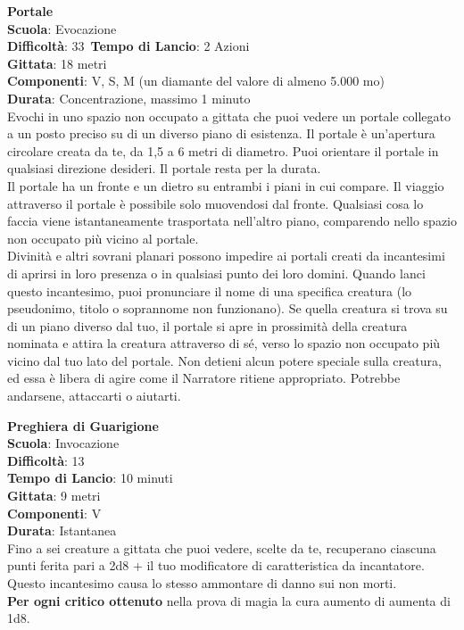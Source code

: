 \begin{multicols}{2}
\medskip\textbf{Portale}\\
\textbf{Scuola}: Evocazione\\
\textbf{Difficoltà}: 33\
\textbf{Tempo di Lancio}: 2 Azioni\\
\textbf{Gittata}: 18 metri\\
\textbf{Componenti}: V, S, M (un diamante del valore di almeno 5.000 mo)\\
\textbf{Durata}: Concentrazione, massimo 1 minuto\\
Evochi in uno spazio non occupato a gittata che puoi vedere un portale collegato a un posto preciso su di un diverso piano di esistenza. Il portale è un'apertura circolare creata da te, da 1,5 a 6 metri di diametro. Puoi orientare il portale in qualsiasi direzione desideri. Il portale resta per la durata.\\
Il portale ha un fronte e un dietro su entrambi i piani in cui compare. Il viaggio attraverso il portale è possibile solo muovendosi dal fronte. Qualsiasi cosa lo faccia viene istantaneamente trasportata nell'altro piano, comparendo nello spazio non occupato più vicino al portale.\\
Divinità e altri sovrani planari possono impedire ai portali creati da incantesimi di aprirsi in loro presenza o in qualsiasi punto dei loro domini. Quando lanci questo incantesimo, puoi pronunciare il nome di una specifica creatura (lo pseudonimo, titolo o soprannome non funzionano). Se quella creatura si trova su di un piano diverso dal tuo, il portale si apre in prossimità della creatura nominata e attira la creatura attraverso di sé, verso lo spazio non occupato più vicino dal tuo lato del portale. Non detieni alcun potere speciale sulla creatura, ed essa è libera di agire come il Narratore ritiene appropriato. Potrebbe andarsene, attaccarti o aiutarti.

\medskip\textbf{Preghiera di Guarigione}\\
\textbf{Scuola}: Invocazione\\
\textbf{Difficoltà}:  13\\
\textbf{Tempo di Lancio}: 10 minuti\\
\textbf{Gittata}: 9 metri\\
\textbf{Componenti}: V\\
\textbf{Durata}: Istantanea\\
Fino a sei creature a gittata che puoi vedere, scelte da te, recuperano ciascuna punti ferita pari a 2d8 + il tuo modificatore di caratteristica da incantatore. Questo incantesimo causa lo stesso ammontare di danno sui non morti.\\
\textbf{Per ogni critico ottenuto} nella prova di magia la cura aumento di aumenta di 1d8.


\end{multicols}
